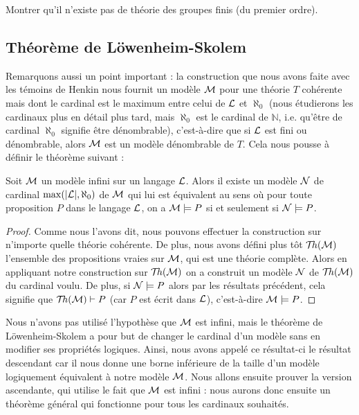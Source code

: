 \begin{exo}
    Montrer qu'il n'existe pas de théorie des groupes finis (du premier ordre).
\end{exo}

\subsection{Théorème de Löwenheim-Skolem}

Remarquons aussi un point important : la construction que nous avons faite avec les témoins de Henkin nous fournit un modèle $\mathcal M$ pour une théorie $T$ cohérente mais dont le cardinal est le maximum entre celui de $\mathcal L$ et $\aleph_0$ (nous étudierons les cardinaux plus en détail plus tard, mais $\aleph_0$ est le cardinal de $\mathbb N$, i.e. qu'être de cardinal $\aleph_0$ signifie être dénombrable), c'est-à-dire que si $\mathcal L$ est fini ou dénombrable, alors $\mathcal M$ est un modèle dénombrable de $T$. Cela nous pousse à définir le théorème suivant :

\begin{them}
    Soit $\mathcal M$ un modèle infini sur un langage $\mathcal L$. Alors il existe un modèle $\mathcal N$ de cardinal $\max(|\mathcal L|,\aleph_0)$ de $\mathcal M$ qui lui est équivalent au sens où pour toute proposition $P$ dans le langage $\mathcal L$, on a $\mathcal M\models P$ si et seulement si $\mathcal N\models P$.
\end{them}

\begin{proof}
    Comme nous l'avons dit, nous pouvons effectuer la construction sur n'importe quelle théorie cohérente. De plus, nous avons défini plus tôt $\mathcal{T}\!h(\mathcal M)$ l'ensemble des propositions vraies sur $\mathcal M$, qui est une théorie complète. Alors en appliquant notre construction sur $\mathcal{T}\!h(\mathcal M)$ on a construit un modèle $\mathcal N$ de $\mathcal{T}\!h(\mathcal M)$ du cardinal voulu. De plus, si $\mathcal N\models P$ alors par les résultats précédent, cela signifie que $\mathcal{T}\!h(\mathcal M)\vdash P$ (car $P$ est écrit dans $\mathcal L$), c'est-à-dire $\mathcal M\models P$.
\end{proof}

\begin{rmk}
    Nous n'avons pas utilisé l'hypothèse que $\mathcal M$ est infini, mais le théorème de Löwenheim-Skolem a pour but de changer le cardinal d'un modèle sans en modifier ses propriétés logiques. Ainsi, nous avons appelé ce résultat-ci le résultat descendant car il nous donne une borne inférieure de la taille d'un modèle logiquement équivalent à notre modèle $\mathcal M$. Nous allons ensuite prouver la version ascendante, qui utilise le fait que $\mathcal M$ est infini : nous aurons donc ensuite un théorème général qui fonctionne pour tous les cardinaux souhaités.
\end{rmk}


